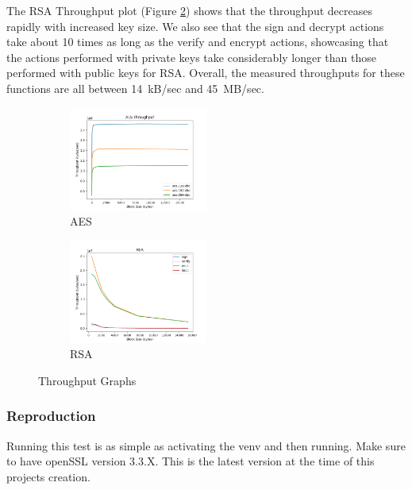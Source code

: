 \documentclass[11pt]{article}
\begin{document}
The RSA Throughput plot (Figure \ref{fig:rsa}) shows that the throughput decreases rapidly with increased key size. We also see that the sign and decrypt actions take about 10 times as long as the verify and encrypt actions, showcasing that the actions performed with private keys take considerably longer than those performed with public keys for RSA. Overall, the measured throughputs for these functions are all between 14~kB/sec and 45~MB/sec.

\begin{figure}[!ht]
	\centering
	\begin{subfigure}{1.00\textwidth}
		\centering
		\includegraphics[width=0.5\textwidth]{./assets/aes.png}
		\caption{AES}
		\label{fig:aes}
	\end{subfigure}
	\begin{subfigure}{1.00\textwidth}
		\centering
		\includegraphics[width=0.5\textwidth]{./assets/rsa.png}
		\caption{RSA}
		\label{fig:rsa}
	\end{subfigure}
	\caption{Throughput Graphs}
	\label{fig:throughput}
\end{figure}

\subsubsection*{Reproduction}

Running this test is as simple as activating the venv and then running. Make sure to have openSSL version 3.3.X. This is the latest version at the time of this projects creation. 
\end{document}
